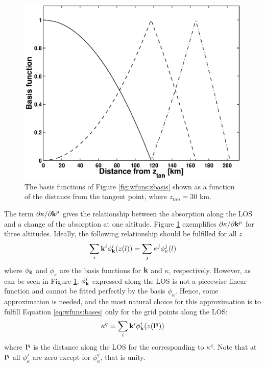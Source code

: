  \begin{figure}[t]
  \begin{center}
   \includegraphics*[width=0.7\hsize]{Figs/fig_absbasis_l.eps}
   \caption{The basis functions of Figure \ref{fig:wfuns:zbasis} shown
            as a function of the distance from the tangent point, where
            $z_{tan}=30$ km.}
   \label{fig:wfuns:lbasis}  
  \end{center}
 \end{figure}
 
 The term $\partial\kappa/ \partial \mathbf{k}^p$ gives the relationship
 between the absorption along the LOS and a change of the absorption
 at one altitude.  Figure \ref{fig:wfuns:lbasis} exemplifies
 $\partial\kappa/ \partial \mathbf{k}^p$ for three altitudes. Ideally, the
 following relationship should be fulfilled for all $z$
 \begin{equation}
   \sum_i\mathbf{k}^i\phi^i_{\mathbf{k}}(z(l)) = \sum_j \kappa^j\phi^j_{\kappa}(l)
  \label{eq:wfuns:bases}
 \end{equation}
 where $\phi_{\mathbf{k}}$ and $\phi_{\kappa}$ are the basis functions for
 $\mathbf{k}$ and $\kappa$, respectively. However, as can be seen in
 Figure \ref{fig:wfuns:lbasis}, $\phi^i_{\mathbf{k}}$ expressed along the
 LOS is not a piecewise linear function and cannot be fitted perfectly
 by the basis $\phi_{\kappa}$. Hence, some approximation is needed,
 and the most natural choice for this approximation is to fulfill
 Equation \ref{eq:wfuns:bases} only for the grid points along the LOS:
 \begin{equation}
   \kappa^q = \sum_i\mathbf{k}^i\phi^i_{\mathbf{k}}(z(\mathbf{l}^q))
 \end{equation}
 where $\mathbf{l}^q$ is the distance along the LOS for the corresponding to
 $\kappa^q$. Note that at $\mathbf{l}^q$ all $\phi_{\kappa}^j$ are zero except
 for $\phi_{\kappa}^q$, that is unity.

